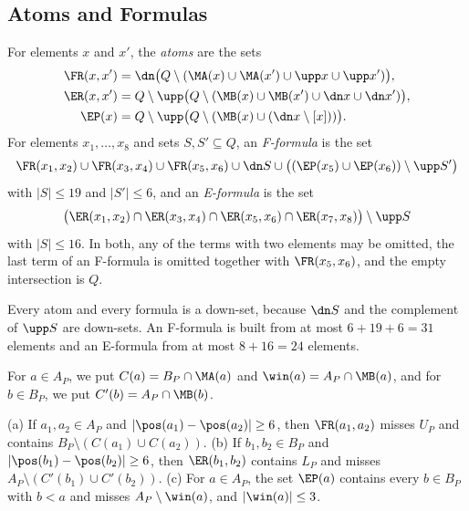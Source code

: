 \subsection{Atoms and Formulas}
\label{sec:pa-atoms}

\begin{definition}
\label{def:pa-atoms}
For elements $x$ and $x'$, the \emph{atoms} are the sets
\begin{align*}
\FR(x, x') &= \dn \bigl(Q \setminus (\MA(x) \cup \MA(x') \cup \upp x \cup \upp x')\bigr),\\
\ER(x, x') &= Q \setminus \upp \bigl(Q \setminus (\MB(x) \cup \MB(x') \cup \dn x \cup \dn x')\bigr),\\
\EP(x) &= Q \setminus \upp \bigl(Q \setminus (\MB(x) \cup (\dn x \setminus [x]))\bigr).
\end{align*}
For elements $x_1, \dots, x_8$ and sets $S, S' \subseteq Q$, an \emph{F-formula} is the set
\[
\FR(x_1, x_2) \cup \FR(x_3, x_4) \cup \FR(x_5, x_6) \cup \dn S \cup \bigl((\EP(x_5) \cup \EP(x_6)) \setminus \upp S'\bigr)
\]
with $|S| \leq 19$ and $|S'| \leq 6$, and an \emph{E-formula} is the set
\[
\bigl(\ER(x_1, x_2) \cap \ER(x_3, x_4) \cap \ER(x_5, x_6) \cap \ER(x_7, x_8)\bigr) \setminus \upp S
\]
with $|S| \leq 16$.
In both, any of the terms with two elements may be omitted, the last term of an F-formula is omitted together with $\FR(x_5, x_6)$, and the empty intersection is $Q$.
\end{definition}

Every atom and every formula is a down-set, because $\dn S$ and the complement of $\upp S$ are down-sets.
An F-formula is built from at most $6 + 19 + 6 = 31$ elements and an E-formula from at most $8 + 16 = 24$ elements.

For $a \in A_P$, we put $C(a) = B_P \cap \MA(a)$ and $\win(a) = A_P \cap \MB(a)$, and for $b \in B_P$, we put $C'(b) = A_P \cap \MB(b)$.

\begin{lemma}[Atoms]
\label{lem:pa-atoms}
(a) If $a_1, a_2 \in A_P$ and $|\pos(a_1) - \pos(a_2)| \geq 6$, then $\FR(a_1, a_2)$ misses $U_P$ and contains $B_P \setminus (C(a_1) \cup C(a_2))$.
(b) If $b_1, b_2 \in B_P$ and $|\pos(b_1) - \pos(b_2)| \geq 6$, then $\ER(b_1, b_2)$ contains $L_P$ and misses $A_P \setminus (C'(b_1) \cup C'(b_2))$.
(c) For $a \in A_P$, the set $\EP(a)$ contains every $b \in B_P$ with $b < a$ and misses $A_P \setminus \win(a)$, and $|\win(a)| \leq 3$.
\end{lemma}

